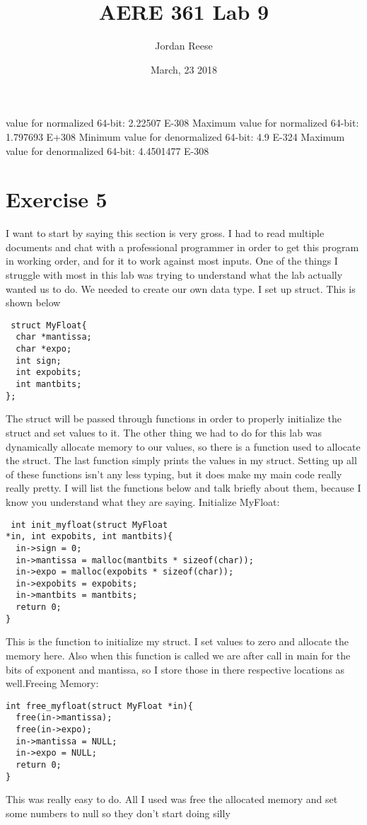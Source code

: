 \documentclass{article} \usepackage[utf8]{inputenc} \title{AERE 361 Lab 9} \author{Jordan Reese} \date{March, 23 2018} \usepackage{listings} \usepackage{color}
\begin{document}
value for normalized 64-bit: 2.22507 E-308 \newline Maximum value for normalized 64-bit: 1.797693 E+308 \newline Minimum value for denormalized 64-bit: 4.9 
E-324 \newline Maximum value for denormalized 64-bit: 4.4501477 E-308 \section{Exercise 5} I want to start by saying this section is very gross. I had to read 
multiple documents and chat with a professional programmer in order to get this program in working order, and for it to work against most inputs. One of the 
things I struggle with most in this lab was trying to understand what the lab actually wanted us to do. We needed to create our own data type. I set up struct. 
This is shown below \begin{lstlisting} struct MyFloat{
  char *mantissa;
  char *expo;
  int sign;
  int expobits;
  int mantbits;
};
\end{lstlisting} The struct will be passed through functions in order to properly initialize the struct and set values to it. The other thing we had to do for 
this lab was dynamically allocate memory to our values, so there is a function used to allocate the struct. The last function simply prints the values in my 
struct. Setting up all of these functions isn't any less typing, but it does make my main code really really pretty. I will list the functions below and talk 
briefly about them, because I know you understand what they are saying. \newline \newline Initialize MyFloat: \begin{lstlisting} int init_myfloat(struct MyFloat 
*in, int expobits, int mantbits){
  in->sign = 0;
  in->mantissa = malloc(mantbits * sizeof(char));
  in->expo = malloc(expobits * sizeof(char));
  in->expobits = expobits;
  in->mantbits = mantbits;
  return 0;
}
\end{lstlisting} This is the function to initialize my struct. I set values to zero and allocate the memory here. Also when this function is called we are after 
call in main for the bits of exponent and mantissa, so I store those in there respective locations as well.\newline \newline Freeing Memory: \begin{lstlisting} 
int free_myfloat(struct MyFloat *in){
  free(in->mantissa);
  free(in->expo);
  in->mantissa = NULL;
  in->expo = NULL;
  return 0;
}
\end{lstlisting} This was really easy to do. All I used was free the allocated memory and set some numbers to null so they don't start doing silly 
\end{document}
